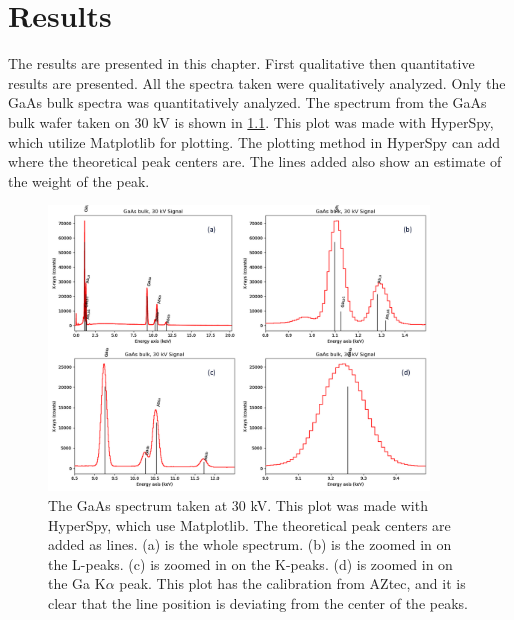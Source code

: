 \chapter{Results}
\label{chap:results}




The results are presented in this chapter.
First qualitative then quantitative results are presented.
All the spectra taken were qualitatively analyzed.
Only the GaAs bulk spectra was quantitatively analyzed.
The spectrum from the GaAs bulk wafer taken on 30 kV is shown in \cref{fig:GaAs30kV_HS}.
This plot was made with HyperSpy, which utilize Matplotlib for plotting.
The plotting method in HyperSpy can add where the theoretical peak centers are.
The lines added also show an estimate of the weight of the peak.


\begin{figure}
    \centering
    \includegraphics[width=0.90\textwidth]{figures/GaAs30kV_HS.png}
    \caption{
        The GaAs spectrum taken at 30 kV.
        This plot was made with HyperSpy, which use Matplotlib.
        The theoretical peak centers are added as lines.
        (a) is the whole spectrum.
        (b) is the zoomed in on the L-peaks.
        (c) is zoomed in on the K-peaks.
        (d) is zoomed in on the Ga K$\alpha$ peak.
        This plot has the calibration from AZtec, and it is clear that the line position is deviating from the center of the peaks.
    }
    \label{fig:GaAs30kV_HS}
\end{figure}




